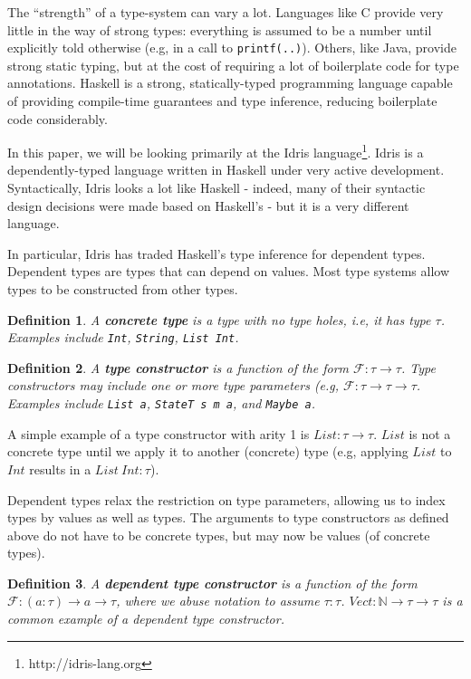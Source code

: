 \documentclass[12pt]{article}
\newtheorem{defn}{Definition}[section]
\begin{document}
The ``strength'' of a type-system can vary a lot.
Languages like C provide very little in the way of strong types: everything is assumed to be a number until explicitly told otherwise (e.g, in a call to \texttt{printf(..)}).
Others, like Java, provide strong static typing, but at the cost of requiring a lot of boilerplate code for type annotations.
Haskell is a strong, statically-typed programming language capable of providing compile-time guarantees and type inference, reducing boilerplate code considerably.

In this paper, we will be looking primarily at the Idris language\footnote{http://idris-lang.org}.
Idris is a dependently-typed language written in Haskell under very active development.
Syntactically, Idris looks a lot like Haskell - indeed, many of their syntactic design decisions were made based on Haskell's - but it is a very different language.

In particular, Idris has traded Haskell's type inference for dependent types.
Dependent types are types that can depend on values.
Most type systems allow types to be constructed from other types.

\begin{defn}
  A \textbf{concrete type} is a type with no type holes, i.e, it has type $\tau$. Examples include \texttt{Int}, \texttt{String}, \texttt{List Int}.
\end{defn}

\begin{defn}
  A \textbf{type constructor} is a function of the form
  $\mathcal{F} : \tau \rightarrow \tau$. Type constructors may include one or more type parameters (e.g, $\mathcal{F} : \tau \rightarrow \tau \rightarrow \tau$.
  Examples include \texttt{List a}, \texttt{StateT s m a}, and \texttt{Maybe a}.
\end{defn}

A simple example of a type constructor with arity 1 is $List : \tau \rightarrow \tau$.
$List$ is not a concrete type until we apply it to another (concrete) type (e.g, applying $List$ to $Int$ results in a $List\ Int : \tau$).

Dependent types relax the restriction on type parameters, allowing us to index types by values as well as types.
The arguments to type constructors as defined above do not have to be concrete types, but may now be values (of concrete types).

\begin{defn}
  A \textbf{dependent type constructor} is a function of the form
  $\mathcal{F} : (a : \tau) \rightarrow a \rightarrow \tau$, where we abuse notation to assume $\tau : \tau$.
  $Vect : \mathbb{N} \rightarrow \tau \rightarrow \tau$ is a common example of a dependent type constructor.
\end{defn}
\end{document}
